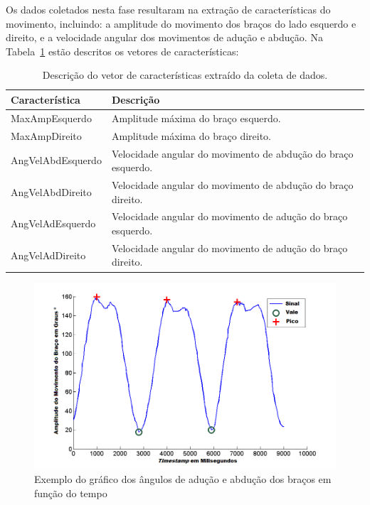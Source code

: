 Os dados coletados nesta fase resultaram na extração de características do movimento, incluindo: a amplitude do movimento dos braços do lado esquerdo e direito, e a velocidade angular dos movimentos de adução e abdução. Na Tabela~\ref{table:features} estão descritos os vetores de características:

\begin{table}[h]
\centering
\caption{Descrição do vetor de características extraído da coleta de dados.}
\label{table:features}
\begin{tabular}{|l|l|}
\hline
{\bf Característica}  & {\bf Descrição}                                       \\ \hline
MaxAmpEsquerdo     & Amplitude máxima do braço esquerdo. \\ \hline
MaxAmpDireito    & Amplitude máxima do braço direito. \\ \hline
AngVelAbdEsquerdo  & Velocidade angular do movimento de abdução do braço esquerdo. \\ \hline
AngVelAbdDireito & Velocidade angular do movimento de abdução do braço direito. \\ \hline
AngVelAdEsquerdo  & Velocidade angular do movimento de adução do braço esquerdo. \\ \hline
AngVelAdDireito & Velocidade angular do movimento de adução do braço direito. \\ \hline
\end{tabular}
\end{table}

\begin{figure}[!htb]
	\centering
	\includegraphics[width=1\textwidth]{img/signalamplitudepeakvaley-2.png}
	\caption{Exemplo do gráfico dos ângulos de adução e abdução dos braços em função do tempo}
	\label{fig:signalamplitudepeakvaley}
\end{figure}

